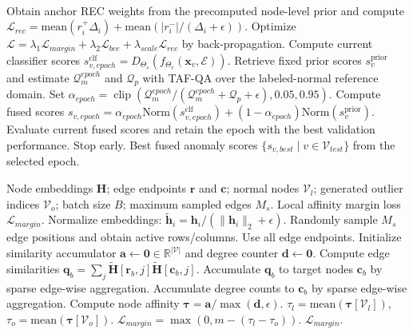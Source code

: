 ﻿﻿﻿﻿    \documentclass[conference, onecolumn]{IEEEtran}
\begin{document}
\begin{algorithm}[htbp]
\begin{algorithmic}[1]
        \STATE Obtain anchor REC weights from the precomputed node-level prior and compute
        \STATE \quad $\mathcal{L}_{rec}=\mathrm{mean}(r_i^+\Delta_i)+\mathrm{mean}(|r_i^-|/(\Delta_i+\epsilon))$.
        \STATE Optimize $\mathcal{L}=\lambda_1\mathcal{L}_{margin}+\lambda_2\mathcal{L}_{bce}+\lambda_{scale}\mathcal{L}_{rec}$ by back-propagation.
        \STATE Compute current classifier scores $s_{v,epoch}^{\mathrm{clf}}=D_{\Theta_s}(f_{\Theta_e}(\mathbf{x}_v,\mathcal{E}))$.
        \STATE Retrieve fixed prior scores $s_v^{\mathrm{prior}}$ and estimate $\mathcal{Q}_{m}^{epoch}$ and $\mathcal{Q}_{p}$ with TAF-QA over the labeled-normal reference domain.
        \STATE Set $\alpha_{epoch}=\operatorname{clip}(\mathcal{Q}_{m}^{epoch}/(\mathcal{Q}_{m}^{epoch}+\mathcal{Q}_{p}+\epsilon),0.05,0.95)$.
        \STATE Compute fused scores $s_{v,epoch}=\alpha_{epoch}\mathrm{Norm}(s_{v,epoch}^{\mathrm{clf}})+(1-\alpha_{epoch})\mathrm{Norm}(s_v^{\mathrm{prior}})$.
        \STATE Evaluate current fused scores and retain the epoch with the best validation performance.
            \STATE Stop early.
        \ENDIF
    \ENDFOR
    \RETURN Best fused anomaly scores $\{s_{v,best}\mid v\in\mathcal{V}_{test}\}$ from the selected epoch.
    \end{algorithmic}
    \end{algorithm}

    \begin{algorithm}[htbp]
    \caption{Sparse Local Affinity Computation}
    \label{alg:sparse_affinity}
    \begin{algorithmic}[1]
    \REQUIRE Node embeddings $\mathbf{H}$; edge endpoints $\mathbf{r}$ and $\mathbf{c}$; normal nodes $\mathcal{V}_l$; generated outlier indices $\mathcal{V}_o$; batch size $B$; maximum sampled edges $M_s$.
    \ENSURE Local affinity margin loss $\mathcal{L}_{margin}$.
    \STATE Normalize embeddings: $\tilde{\mathbf{h}}_i=\mathbf{h}_i/(\|\mathbf{h}_i\|_2+\epsilon)$.
        \STATE Randomly sample $M_s$ edge positions and obtain active rows/columns.
    \ELSE
        \STATE Use all edge endpoints.
    \ENDIF
    \STATE Initialize similarity accumulator $\mathbf{a}\leftarrow\mathbf{0}\in\mathbb{R}^{|\mathcal{V}|}$ and degree counter $\mathbf{d}\leftarrow\mathbf{0}$.
        \STATE Compute edge similarities $\mathbf{q}_b=\sum_j \tilde{\mathbf{H}}[\mathbf{r}_b,j]\tilde{\mathbf{H}}[\mathbf{c}_b,j]$.
        \STATE Accumulate $\mathbf{q}_b$ to target nodes $\mathbf{c}_b$ by sparse edge-wise aggregation.
        \STATE Accumulate degree counts to $\mathbf{c}_b$ by sparse edge-wise aggregation.
    \ENDFOR
    \STATE Compute node affinity $\boldsymbol{\tau}=\mathbf{a}/\max(\mathbf{d},\epsilon)$.
    \STATE $\tau_l=\mathrm{mean}(\boldsymbol{\tau}[\mathcal{V}_l])$, $\tau_o=\mathrm{mean}(\boldsymbol{\tau}[\mathcal{V}_o])$.
    \STATE $\mathcal{L}_{margin}=\max(0,m-(\tau_l-\tau_o))$.
    \RETURN $\mathcal{L}_{margin}$.
    \end{algorithmic}
    \end{algorithm}

    
\end{document}
